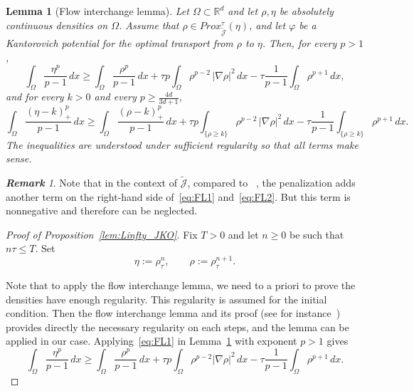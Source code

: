 \documentclass[a4paper,twosided, 11pt]{article}
\theoremstyle{plain}
\newtheorem{lemma}[thm]{Lemma}
\theoremstyle{remark}
\newtheorem{remark}[thm]{\bf Remark}
\numberwithin{equation}{section}
\begin{document}
{\begin{lemma}[Flow interchange lemma]\label{lem:lp_mccann}
Let $\Omega\subset\mathbb{R}^d$ and let $\rho,\eta$ be absolutely continuous densities on $\Omega$.
Assume that $\rho\in Prox_{\widetilde{\mathcal{J}}}^{\tau}(\eta)$, and let $\varphi$ be a Kantorovich potential for the optimal transport from $\rho$ to $\eta$.
Then, for every $p>1$,
\begin{equation}\label{eq:FL1}
\int_{\Omega}\frac{\eta^p}{p-1}\,dx
 \ge 
\int_{\Omega}\frac{\rho^p}{p-1}\,dx
 +\tau 
p\int_{\Omega}\rho^{p-2}\,|\nabla\rho|^2\,dx
-\tau \frac{1}{p-1}\int_{\Omega}\rho^{p+1}\,dx,
\end{equation}
and for every $k>0$ and every $p\ge\frac{4d}{3d+1}$,
\begin{equation}\label{eq:FL2}
\int_{\Omega}\frac{(\eta-k)_{+}^{p}}{p-1}\,dx
 \ge \int_{\Omega}\frac{(\rho-k)_{+}^{p}}{p-1}\,dx
 +\tau 
p\int_{\{\rho\ge k\}}\rho^{p-2}\,|\nabla\rho|^2\,dx
-\tau \frac{1}{p-1}\int_{\{\rho\ge k\}}\rho^{p+1}\,dx.
\end{equation}
The inequalities are understood under sufficient regularity so that all terms make sense.
\end{lemma}

\begin{remark}
Note that in the context of $\widetilde{\mathcal{J}}$, compared to ~\cite{dimarino}, the penalization adds another term on the right-hand side of~\eqref{eq:FL1} and~\eqref{eq:FL2}. But this term is nonnegative and therefore can be neglected. 
\end{remark}

\begin{proof}[Proof of Proposition~\ref{lem:Linfty_JKO}]

Fix $T>0$ and let $n\ge 0$ be such that $n\tau\le T$. Set
\[
\eta:=\rho_\tau^{n},\qquad
\rho:=\rho_\tau^{n+1}.
\]

Note that to apply the flow interchange lemma, we need to a priori to prove the densities have enough regularity. This regularity is assumed for the initial condition. Then the flow interchange lemma and its proof (see for instance~\cite{Lisini-CH-gradient-flow}) provides directly the necessary regularity on each steps, and the lemma can be applied in our case. Applying~\eqref{eq:FL1} in Lemma~\ref{lem:lp_mccann} with exponent $p>1$ gives
\begin{equation}\label{eq:FI_discrete_simplified_new}
\int_\Omega \frac{\eta^p}{p-1}\,dx
\ge
\int_\Omega \frac{\rho^p}{p-1}\,dx
+\tau p\int_\Omega \rho^{p-2}|\nabla\rho|^2\,dx
-\tau \frac{1}{p-1}\int_\Omega \rho^{p+1}\,dx .
\end{equation}


\end{proof}}
\end{document}
